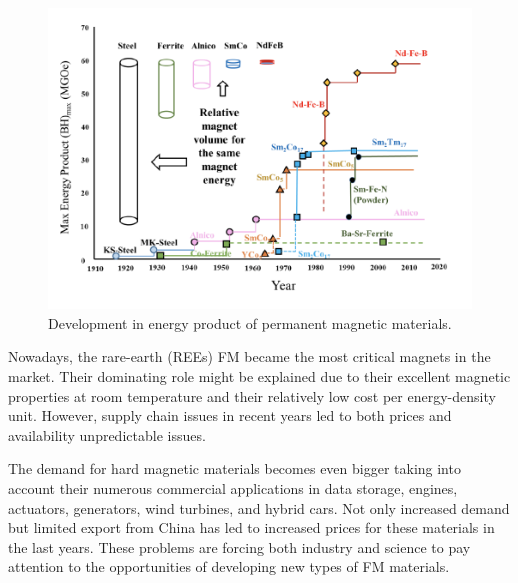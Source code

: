 \begin{figure}[H]
	\centering
	\includegraphics{fig/review/history.png}
	\caption[Development in energy product of permanent magnetic materials]{Development in energy product of permanent magnetic materials.}
	\label{fig:history}
\end{figure}

Nowadays, the rare-earth (REEs) FM became the most critical magnets in the market. Their dominating role might be explained due to their excellent magnetic properties at room temperature and their relatively low cost per energy-density unit. However, supply chain issues in recent years led to both prices and availability unpredictable issues.

The demand for hard magnetic materials becomes even bigger taking into account their numerous commercial applications in data storage, engines, actuators, generators, wind turbines, and hybrid cars. Not only increased demand but limited export from China has led to increased prices for these materials in the last years. These problems are forcing both industry and science to pay attention to the opportunities of developing new types of FM materials.